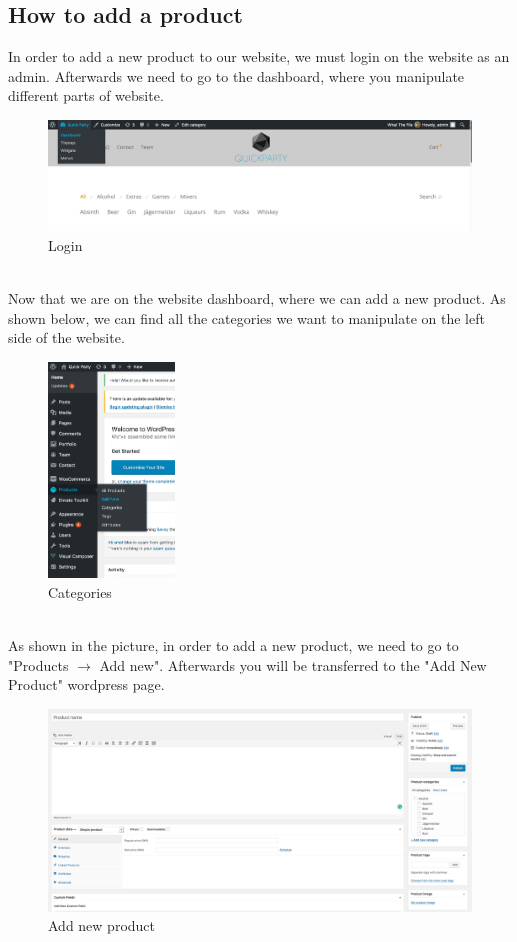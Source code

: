 \documentclass[12p]{article}
\begin{document}
\subsection{How to add a product}
In order to add a new product to our website, we must login on the website as an admin. Afterwards we need to go to the dashboard, where you manipulate different parts of website.
\begin{figure}[ht]
    \centering
    \includegraphics[width=1\textwidth]{1.png}
    \caption{Login}
    \label{fig:login}
\end{figure}
\\
Now that we are on the website dashboard, where we can add a new product. As shown below, we can find all the categories we want to manipulate on the left side of the website.
\begin{figure}[ht]
    \centering
    \includegraphics[width=0.3\textwidth]{2.png}
    \caption{Categories}
    \label{fig:wordpress_categories}
\end{figure}
\\
As shown in the picture, in order to add a new product, we need to go to "Products $\rightarrow$ Add new". Afterwards you will be transferred to the "Add New Product" wordpress page.
\newpage %
\begin{figure}[ht]
    \centering
    \includegraphics[width=1\textwidth]{3.png}
    \caption{Add new product}
    \label{fig:wordpress_add_new_product}
\end{figure}
\end{document}
